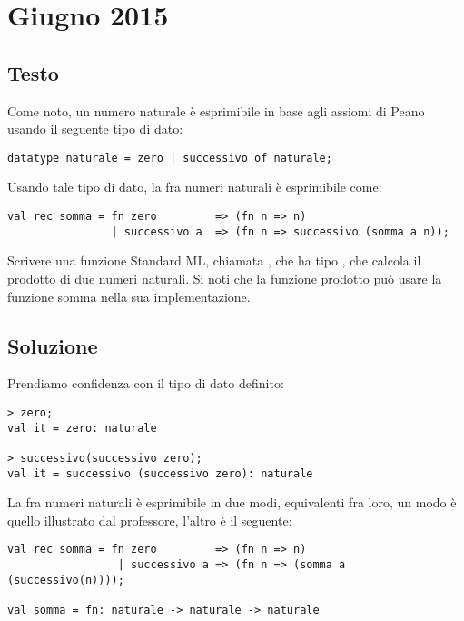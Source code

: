 \section{Giugno 2015}

\subsection{Testo}

Come noto, un numero naturale è esprimibile in base agli assiomi di Peano usando il seguente tipo di dato:

\begin{lstlisting}[style = SML, caption = {Definizione di numero naturale tramite gli Assiomi di Peano}]
datatype naturale = zero | successivo of naturale;
\end{lstlisting}

Usando tale tipo di dato, la  fra numeri naturali è esprimibile come:

\begin{lstlisting}[style = SML, caption = {Definizione della funzione \sml{somma} tramite gli Assiomi di Peano}]
val rec somma = fn zero         => (fn n => n)
				| successivo a	=> (fn n => successivo (somma a n));
\end{lstlisting}

Scrivere una funzione Standard ML, chiamata , che ha tipo , che calcola il prodotto di due numeri naturali. Si noti che la funzione prodotto può usare la funzione somma nella sua implementazione.

\subsection{Soluzione}

Prendiamo confidenza con il tipo di dato definito:

\begin{lstlisting}[style = SML, caption = {Dichiarazione di numeri naturali}]
> zero;
val it = zero: naturale

> successivo(successivo zero);
val it = successivo (successivo zero): naturale
\end{lstlisting}

La  fra numeri naturali è esprimibile in due modi, equivalenti fra loro, un modo è quello illustrato dal professore, l'altro è il seguente:

\begin{lstlisting}[style = SML, caption = {Definizione \emph{alternativa} della funzione \sml{somma} tramite gli Assiomi di Peano}]
val rec somma = fn zero			=> (fn n => n)
 				 | successivo a => (fn n => (somma a (successivo(n))));

val somma = fn: naturale -> naturale -> naturale
\end{lstlisting}

